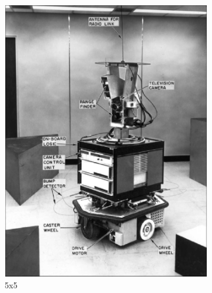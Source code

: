 \documentclass[lettersize,journal]{IEEEtran}
\begin{document}
\begin{figure}[h]
\begin{subfigure}[h]{0.115\textwidth}
        \includegraphics[width=\linewidth]{gaussian_map_5x5_sigma_1}
        \caption{5x5}  
    \end{subfigure}
    \begin{subfigure}[h]{0.115\textwidth}
        \centering

\end{subfigure}
\end{figure}
\end{document}
